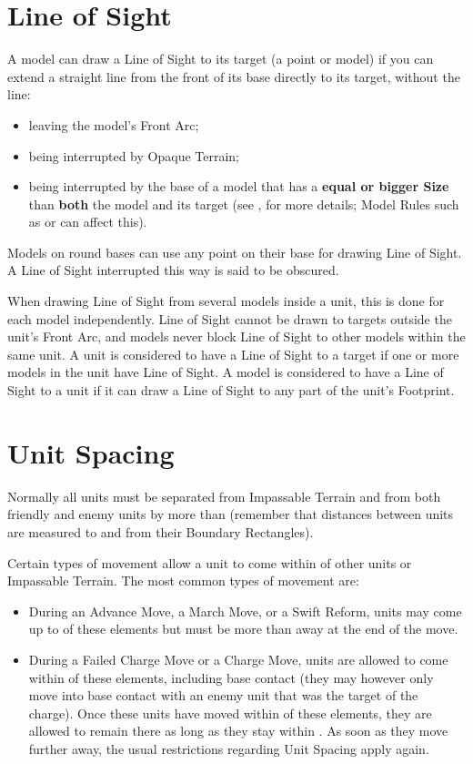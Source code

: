 \section{Line of Sight}
\label{line_of_sight}

A model can draw a Line of Sight to its target (a point or model) if you can extend a straight line from the front of its base directly to its target, without the line:
\begin{itemize}[label={-}]
\item leaving the model's Front Arc;
\item being interrupted by Opaque Terrain;
\item being interrupted by the base of a model that has a \textbf{equal or bigger Size} than \textbf{both} the model and its target (see , for more details; Model Rules such as \hyperref[tall]{\tall} or \hyperref[skirmisher]{\skirmisher} can affect this).
\end{itemize}
Models on round bases can use any point on their base for drawing Line of Sight. A Line of Sight interrupted this way is said to be obscured.

When drawing Line of Sight from several models inside a unit, this is done for each model independently. Line of Sight cannot be drawn to targets outside the unit's Front Arc, and models never block Line of Sight to other models within the same unit. A unit is considered to have a Line of Sight to a target if one or more models in the unit have Line of Sight. A model is considered to have a Line of Sight to a unit if it can draw a Line of Sight to any part of the unit's Footprint.

\section{Unit Spacing}
\label{unit_spacing}

Normally all units must be separated from Impassable Terrain and from both friendly and enemy units by more than  (remember that distances between units are measured to and from their Boundary Rectangles).

Certain types of movement allow a unit to come within  of other units or Impassable Terrain. The most common types of movement are:

\begin{itemize}[label={-}]
\item During an Advance Move, a March Move, or a Swift Reform, units may come up to  of these elements but must be more than  away at the end of the move.
\item During a Failed Charge Move or a Charge Move, units are allowed to come within  of these elements, including base contact (they may however only move into base contact with an enemy unit that was the target of the charge). Once these units have moved within  of these elements, they are allowed to remain there as long as they stay within . As soon as they move further away, the usual restrictions regarding Unit Spacing apply again.
\end{itemize}
